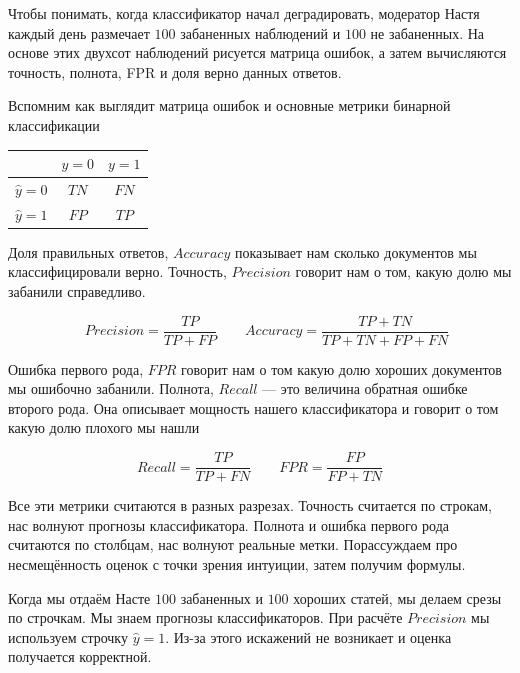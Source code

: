 \documentclass[12pt, a4paper, oneside]{article}
\begin{document}
Чтобы понимать, когда классификатор начал деградировать, модератор Настя каждый день размечает $100$ забаненных наблюдений и $100$ не забаненных. На основе этих двухсот наблюдений рисуется матрица ошибок, а затем вычисляются точность, полнота, FPR и доля верно данных ответов. 

 Вспомним как выглядит матрица ошибок и основные метрики бинарной классификации

\begin{center}
	\begin{tabular}{|c|c|c|}
		\hline
		& $y=0$  &  $ y = 1$ \\  \hline 
		$\hat y = 0$ & $TN$ & $FN$ \\ \hline 
		$\hat y = 1$ & $FP$ & $TP$ \\ \hline
	\end{tabular}
\end{center}

Доля правильных ответов, $Accuracy$ показывает нам сколько документов мы классифицировали верно. Точность, $Precision$ говорит нам о том, какую долю мы забанили справедливо. 

\begin{equation} 
\quad Precision = \frac{TP}{TP + FP} \qquad Accuracy = \frac{TP + TN}{TP + TN + FP + FN}
\end{equation}

Ошибка первого рода, $FPR$ говорит нам о том какую долю хороших документов мы ошибочно забанили. Полнота, $Recall$ --- это величина обратная ошибке второго рода. Она описывает мощность нашего классификатора и говорит о том какую долю плохого мы нашли

\begin{equation} 
Recall = \frac{TP}{TP + FN} \qquad  FPR = \frac{FP}{FP + TN} 
\end{equation}

Все эти метрики считаются в разных разрезах. Точность считается по строкам, нас волнуют прогнозы классификатора. Полнота и ошибка первого рода считаются по столбцам, нас волнуют реальные метки. Порассуждаем про несмещённость оценок с точки зрения интуиции, затем получим формулы. 

Когда мы отдаём Насте $100$ забаненных и $100$ хороших статей, мы делаем срезы по строчкам. Мы знаем прогнозы классификаторов. При расчёте $Precision$ мы используем строчку $\hat y = 1$. Из-за этого искажений не возникает и оценка получается корректной. 
\end{document}
